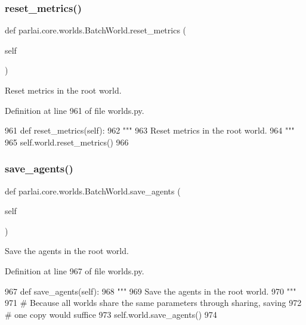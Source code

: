 \subsubsection{\texorpdfstring{reset\+\_\+metrics()}{reset\_metrics()}}
{\footnotesize\ttfamily def parlai.\+core.\+worlds.\+Batch\+World.\+reset\+\_\+metrics (\begin{DoxyParamCaption}\item[{}]{self }\end{DoxyParamCaption})}

\begin{DoxyVerb}Reset metrics in the root world.
\end{DoxyVerb}
 

Definition at line 961 of file worlds.\+py.


\begin{DoxyCode}
961     \textcolor{keyword}{def }reset\_metrics(self):
962         \textcolor{stringliteral}{"""}
963 \textcolor{stringliteral}{        Reset metrics in the root world.}
964 \textcolor{stringliteral}{        """}
965         self.world.reset\_metrics()
966 
\end{DoxyCode}
\mbox{\label{classparlai_1_1core_1_1worlds_1_1BatchWorld_a84ee0ac53e07cbfc9bdb8a978a8df7e1}} 
\subsubsection{\texorpdfstring{save\+\_\+agents()}{save\_agents()}}
{\footnotesize\ttfamily def parlai.\+core.\+worlds.\+Batch\+World.\+save\+\_\+agents (\begin{DoxyParamCaption}\item[{}]{self }\end{DoxyParamCaption})}

\begin{DoxyVerb}Save the agents in the root world.
\end{DoxyVerb}
 

Definition at line 967 of file worlds.\+py.


\begin{DoxyCode}
967     \textcolor{keyword}{def }save\_agents(self):
968         \textcolor{stringliteral}{"""}
969 \textcolor{stringliteral}{        Save the agents in the root world.}
970 \textcolor{stringliteral}{        """}
971         \textcolor{comment}{# Because all worlds share the same parameters through sharing, saving}
972         \textcolor{comment}{# one copy would suffice}
973         self.world.save\_agents()
974 
\end{DoxyCode}
\mbox{\label{classparlai_1_1core_1_1worlds_1_1BatchWorld_ad351080076e31498e14789beddf6fea6}} 
